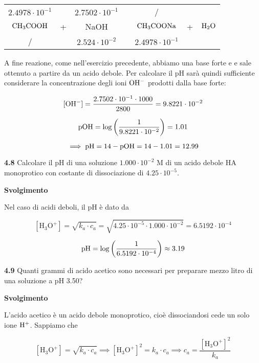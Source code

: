 \begin{center}
    \begin{tabular}{ccccccc}
        $2.4978 \cdot 10^{-1}$ &  & $2.7502 \cdot 10^{-1}$ & & / &&\\
        $\rm CH_3COOH$ & + & NaOH & \ce{->} & $\rm CH_3COONa$ & + & $\rm H_2O$\\
        / &  &  $2.524 \cdot 10^{-2}$ & & $2.4978 \cdot 10^{-1}$&&\\
    \end{tabular}
\end{center}

A fine reazione, come nell'esercizio precedente, abbiamo una base forte e e sale ottenuto a partire da un acido debole. Per calcolare il pH sarà quindi sufficiente considerare la concentrazione degli ioni $\rm OH^-$ prodotti dalla base forte:

$$[\rm OH^-]=\frac{2.7502 \cdot 10^{-1} \cdot 1000}{2800}=9.8221 \cdot 10^{-2}$$

$$\rm pOH=\log{\left(\frac{1}{9.8221 \cdot 10^{-2}}\right)}=1.01$$

$$\implies \rm pH=14-pOH=14-1.01=12.99$$

\vspace{0.2cm}\textbf{4.8} Calcolare il pH di una soluzione $1.000 \cdot 10^{-2}$ M di un acido debole HA monoprotico con costante di dissociazione di $4.25 \cdot  10^{-5}$.

\vspace{0.2cm}\large\textbf{Svolgimento}\normalsize

\vspace{0.2cm}Nel caso di acidi deboli, il pH è dato da

$$[\text{H}_3\text{O}^+] = \sqrt{k_a \cdot c_a}
=\sqrt{4.25 \cdot  10^{-5} \cdot 1.000 \cdot 10^{-2}}=6.5192 \cdot 10^{-4}$$

$$\rm pH=\log{\left(\frac{1}{6.5192 \cdot 10^{-4}}\right)}\approx 3.19$$

\vspace{0.2cm}\textbf{4.9} Quanti grammi di acido acetico sono necessari per preparare mezzo litro di una soluzione a pH 3.50?

\vspace{0.2cm}\large\textbf{Svolgimento}\normalsize

\vspace{0.2cm}L'acido acetico è un acido debole monoprotico, cioè dissociandosi cede un solo ione $\rm H^+$. Sappiamo che

$$[\text{H}_3\text{O}^+] = \sqrt{k_a \cdot c_a}
\implies
[\text{H}_3\text{O}^+]^2 = k_a \cdot c_a
\implies
c_a=\frac{[\text{H}_3\text{O}^+]^2}{k_a}$$

